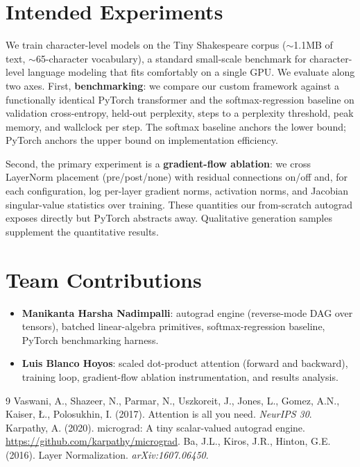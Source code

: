 \documentclass{article}
\begin{document}
\section{Intended Experiments}
We train character-level models on the Tiny Shakespeare corpus ($\sim$1.1MB of text, $\sim$65-character vocabulary), a standard small-scale benchmark for character-level language modeling that fits comfortably on a single GPU. We evaluate along two axes. First, \textbf{benchmarking}: we compare our custom framework against a functionally identical PyTorch transformer and the softmax-regression baseline on validation cross-entropy, held-out perplexity, steps to a perplexity threshold, peak memory, and wallclock per step. The softmax baseline anchors the lower bound; PyTorch anchors the upper bound on implementation efficiency.

Second, the primary experiment is a \textbf{gradient-flow ablation}: we cross LayerNorm placement (pre/post/none) with residual connections on/off and, for each configuration, log per-layer gradient norms, activation norms, and Jacobian singular-value statistics over training. These quantities our from-scratch autograd exposes directly but PyTorch abstracts away. Qualitative generation samples supplement the quantitative results.

\section{Team Contributions}
\begin{itemize}
    \item \textbf{Manikanta Harsha Nadimpalli}: autograd engine (reverse-mode DAG over tensors), batched linear-algebra primitives, softmax-regression baseline, PyTorch benchmarking harness.
    \item \textbf{Luis Blanco Hoyos}: scaled dot-product attention (forward and backward), training loop, gradient-flow ablation instrumentation, and results analysis.
\end{itemize}

{\footnotesize
\begin{thebibliography}{9}
 Vaswani, A., Shazeer, N., Parmar, N., Uszkoreit, J., Jones, L., Gomez, A.N., Kaiser, {\L}., Polosukhin, I. (2017). Attention is all you need. \textit{NeurIPS 30}.
 Karpathy, A. (2020). micrograd: A tiny scalar-valued autograd engine. \url{https://github.com/karpathy/micrograd}.
 Ba, J.L., Kiros, J.R., Hinton, G.E. (2016). Layer Normalization. \textit{arXiv:1607.06450}.
\end{thebibliography}
}
%
\end{document}
